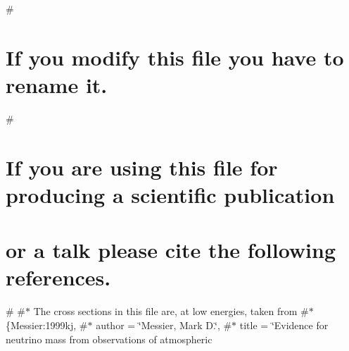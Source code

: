 \# \section*{If you modify this file you have to rename it.}

\# \section*{If you are using this file for producing a scientific publication}

\section*{or a talk please cite the following references.}

\# \#$\ast$ The cross sections in this file are, at low energies, taken from \#$\ast$ \{Messier\+:1999kj, \#$\ast$ author = \char`\"{}\+Messier, Mark D.\char`\"{}, \#$\ast$ title = \char`\"{}\+Evidence for neutrino mass from observations of atmospheric
